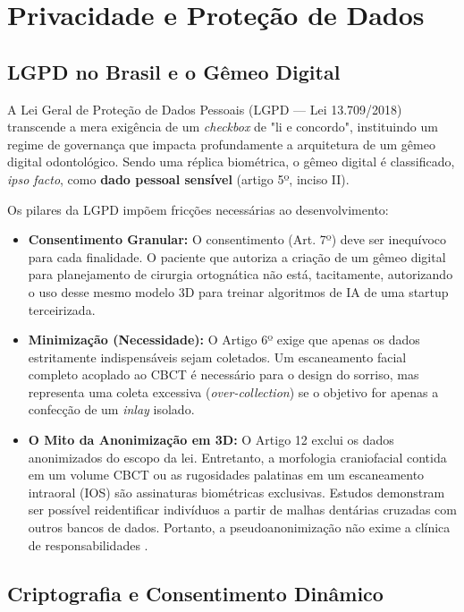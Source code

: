 \section{Privacidade e Proteção de Dados}
\label{sec:privacidade}

\subsection{LGPD no Brasil e o Gêmeo Digital}

A Lei Geral de Proteção de Dados Pessoais (LGPD — Lei 13.709/2018) transcende a mera exigência de um \textit{checkbox} de "li e concordo", instituindo um regime de governança que impacta profundamente a arquitetura de um gêmeo digital odontológico. Sendo uma réplica biométrica, o gêmeo digital é classificado, \textit{ipso facto}, como \textbf{dado pessoal sensível} (artigo 5º, inciso II).

Os pilares da LGPD impõem fricções necessárias ao desenvolvimento:
\begin{itemize}
    \item \textbf{Consentimento Granular:} O consentimento (Art. 7º) deve ser inequívoco para cada finalidade. O paciente que autoriza a criação de um gêmeo digital para planejamento de cirurgia ortognática não está, tacitamente, autorizando o uso desse mesmo modelo 3D para treinar algoritmos de IA de uma startup terceirizada.
    \item \textbf{Minimização (Necessidade):} O Artigo 6º exige que apenas os dados estritamente indispensáveis sejam coletados. Um escaneamento facial completo acoplado ao CBCT é necessário para o design do sorriso, mas representa uma coleta excessiva (\textit{over-collection}) se o objetivo for apenas a confecção de um \textit{inlay} isolado.
    \item \textbf{O Mito da Anonimização em 3D:} O Artigo 12 exclui os dados anonimizados do escopo da lei. Entretanto, a morfologia craniofacial contida em um volume CBCT ou as rugosidades palatinas em um escaneamento intraoral (IOS) são assinaturas biométricas exclusivas. Estudos demonstram ser possível reidentificar indivíduos a partir de malhas dentárias cruzadas com outros bancos de dados. Portanto, a pseudoanonimização não exime a clínica de responsabilidades \cite{springer2026realising}.
\end{itemize}

\subsection{Criptografia e Consentimento Dinâmico}


